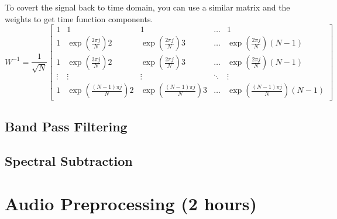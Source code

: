 \documentclass{tufte-handout}
\begin{document}
To covert the signal back to time domain, you can use a similar matrix and the weights to get time function components. 
\begin{equation}\label{eq:basis_fns}
    W^{-1}=\dfrac{1}{\sqrt{N}}
\begin{bmatrix}
    1 & 1 & 1 & \dots  & 1 \\
    1 & \exp(\frac{2 \pi j}{N})2 & \exp(\frac{2 \pi j}{N})3 & \dots  & \exp(\frac{2 \pi j}{N})(N-1) \\
    1 & \exp(\frac{3 \pi j}{N})2 & \exp(\frac{2 \pi j}{N})3 & \dots  & \exp(\frac{2 \pi j}{N}) (N-1) \\
    \vdots & \vdots & \vdots & \ddots & \vdots \\
    1 & \exp(\frac{(N-1) \pi j}{N})2 & \exp(\frac{(N-1) \pi j}{N})3 & \dots  & \exp(\frac{(N-1) \pi j}{N}) (N-1)
\end{bmatrix}
\end{equation}

\subsection{Band Pass Filtering}

\subsection{Spectral Subtraction}



\section{Audio Preprocessing (2 hours)}
\end{document}

